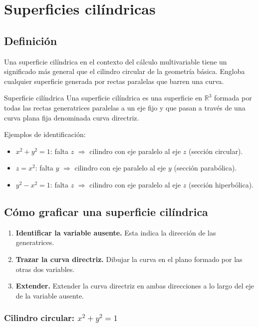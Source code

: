 \section{Superficies cilíndricas}

\subsection{Definición}

Una superficie cilíndrica en el contexto del cálculo multivariable tiene un significado más general que el cilindro circular de la geometría básica. Engloba cualquier superficie generada por rectas paralelas que barren una curva.

\begin{mydefinition}{Superficie cilíndrica}
Una superficie cilíndrica es una superficie en $\mathbb{R}^3$ formada por todas las rectas generatrices paralelas a un eje fijo y que pasan a través de una curva plana fija denominada curva directriz.
\end{mydefinition}

Ejemplos de identificación:
\begin{itemize}
    \item $x^2 + y^2 = 1$: falta $z$ $\Rightarrow$ cilindro con eje paralelo al eje $z$ (sección circular).
    \item $z = x^2$: falta $y$ $\Rightarrow$ cilindro con eje paralelo al eje $y$ (sección parabólica).
    \item $y^2 - x^2 = 1$: falta $z$ $\Rightarrow$ cilindro con eje paralelo al eje $z$ (sección hiperbólica).
\end{itemize}

\subsection{Cómo graficar una superficie cilíndrica}

\begin{enumerate}
    \item \textbf{Identificar la variable ausente.} Esta indica la dirección de las generatrices.
    \item \textbf{Trazar la curva directriz.} Dibujar la curva en el plano formado por las otras dos variables.
    \item \textbf{Extender.} Extender la curva directriz en ambas direcciones a lo largo del eje de la variable ausente.
\end{enumerate}

\subsubsection{Cilindro circular: $x^2 + y^2 = 1$}

